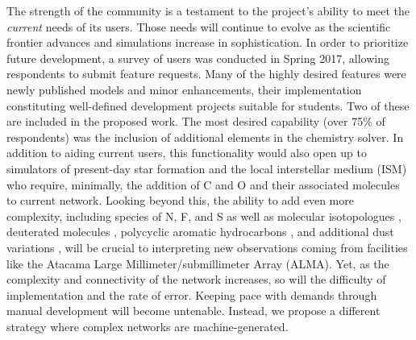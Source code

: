 The strength of the \grackle{} community is a testament to the
project's ability to meet the \textit{current} needs of its
users. Those needs will continue to evolve as the scientific frontier
advances and simulations increase in sophistication.  In order to
prioritize future development, a survey of \grackle{} users was
conducted in Spring 2017, allowing respondents to submit feature
requests.  Many of the highly desired features were newly published
models and minor enhancements, their implementation constituting
well-defined development projects suitable for students.  Two of these
are included in the proposed work.  The most desired
capability (over 75\% of respondents) was the inclusion of additional
elements in the chemistry solver.  In addition to aiding current
users, this functionality would also open \grackle{} up to simulators
of present-day star formation and the local interstellar medium (ISM)
who require, minimally, the addition of C and O and their
associated molecules to  current network.  Looking beyond
this, the ability to add even more complexity, including species of
N, F, and S as well as molecular isotopologues
\citep{2008ApJ...679..481P}, deuterated molecules
\citep{2005ApJ...619..379C}, polycyclic aromatic hydrocarbons
\citep[PAHs,][]{2016JPhCS.728f2005G}, and
additional dust variations \citep{2013RvMP...85.1021T}, will be crucial
to interpreting new observations coming from facilities like the
Atacama Large Millimeter/submillimeter Array (ALMA).
Yet, as the complexity and connectivity of the network increases, so
will the difficulty of implementation and the rate of error.  Keeping
pace with demands through manual development will become
untenable.  Instead, we propose a different strategy where complex
networks are machine-generated.

